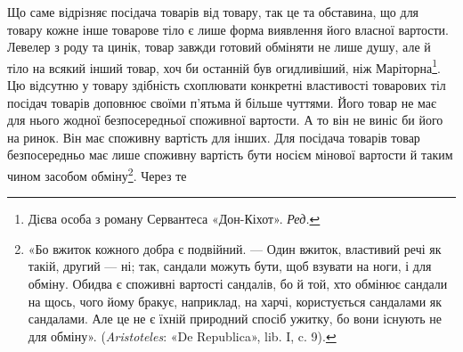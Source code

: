 Що саме відрізняє посідача товарів від товару, так це та обставина,
що для товару кожне інше товарове тіло є лише форма виявлення
його власної вартости. Левелер з роду та цинік, товар
завжди готовий обміняти не лише душу, але й тіло на всякий
інший товар, хоч би останній був огидливіший, ніж Маріторна\footnote*{
Дієва особа з роману Сервантеса «Дон-Кіхот». \emph{Ред.}
}. Цю відсутню у товару здібність схоплювати конкретні
властивості товарових тіл посідач товарів доповнює своїми п’ятьма
й більше чуттями. Його товар не має для нього жодної безпосередньої
споживної вартости. А то він не виніс би його на ринок.
Він має споживну вартість для інших. Для посідача товарів
товар безпосередньо має лише споживну вартість бути носієм
мінової вартости й таким чином засобом обміну\footnote{
«Бо вжиток кожного добра є подвійний. — Один вжиток, властивий
речі як такій, другий — ні; так, сандали можуть бути, щоб взувати
на ноги, і для обміну. Обидва є споживні вартості сандалів, бо й той, хто
обмінює сандали на щось, чого йому бракує, наприклад, на харчі, користується
сандалами як сандалами. Але це не є їхній природний спосіб
ужитку, бо вони існують не для обміну». (\emph{Aristoteles}: «De Republica»,
lib. I, c. 9).
}. Через те
\parbreak{}  %
